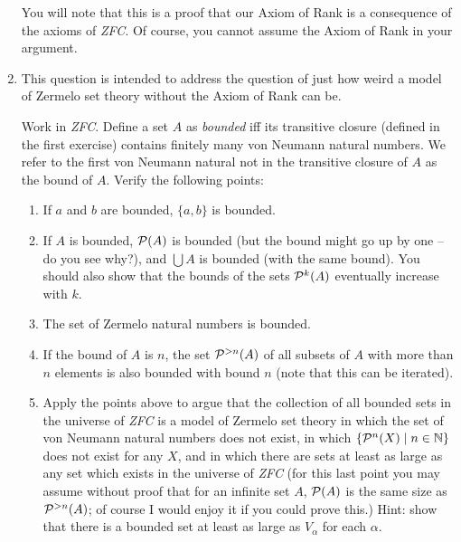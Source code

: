 \documentclass[12pt]{book}
\begin{document}
\begin{enumerate}
You will note that this is a proof that our Axiom of Rank is a consequence of the axioms of {\em ZFC\/}.  Of course, you cannot assume the Axiom of Rank in your argument.

\item

This question is intended to address the question of just how weird a
model of Zermelo set theory without the Axiom of Rank can be.



Work in {\em ZFC\/}.  Define a set $A$ as {\em bounded\/} iff its
transitive closure (defined in the first exercise) contains finitely many von Neumann natural numbers.
We refer to the first von Neumann natural not in the transitive
closure of $A$ as the bound of $A$.  Verify the following points:

\begin{enumerate}

\item  If $a$ and $b$ are bounded, $\{a,b\}$ is bounded.

\item If $A$ is bounded, ${\cal P}(A)$ is bounded (but the bound might
go up by one -- do you see why?), and $\bigcup A$ is bounded (with the
same bound).  You should also show that the bounds of the sets ${\cal
P}^k(A)$ eventually increase with $k$.

\item  The set of Zermelo natural numbers is bounded.

\item If the bound of $A$ is $n$, the set ${\cal P}^{>n}(A)$ of all
subsets of $A$ with more than $n$ elements is also bounded with bound
$n$ (note that this can be iterated).

\item Apply the points above to argue that the collection of all
bounded sets in the universe of {\em ZFC\/} is a model of Zermelo set
theory in which the set of von Neumann natural numbers does not exist,
in which $\{{\cal P}^n(X) \mid n \in {\mathbb N}\}$ does not exist for
any $X$, and in which there are sets at least as large as any set which exists
in the universe of {\em ZFC\/} (for this last point you may assume without proof that for an infinite set $A$, ${\cal P}(A)$ is the same size as ${\cal P}^{>n}(A)$;  of course I would enjoy it if you could prove this.)  Hint:  show that there is a bounded set at least as large as $V_{\alpha}$ for each $\alpha$.

\end{enumerate}

\end{enumerate}
\end{document}
